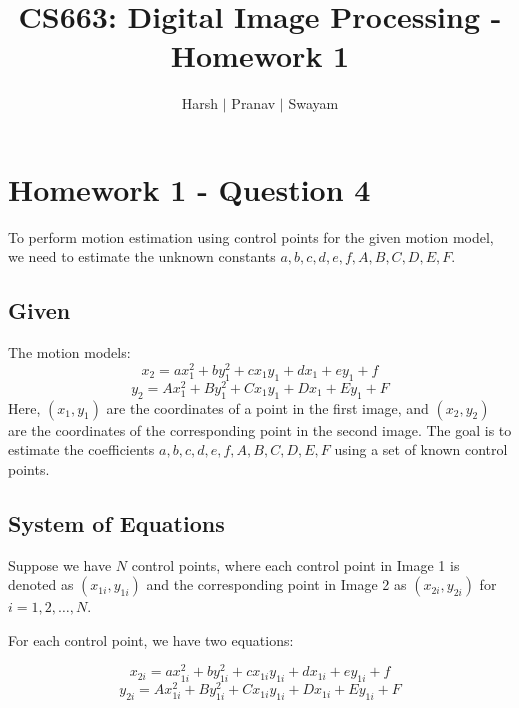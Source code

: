 \documentclass{article}
\title{CS663: Digital Image Processing - Homework 1}
\author{Harsh $\vert$ Pranav $\vert$ Swayam}
\begin{document}
\maketitle
\section{Homework 1 - Question 4}

To perform motion estimation using control points for the given motion model, we need to estimate the unknown constants \(a, b, c, d, e, f, A, B, C, D, E, F\).

\subsection*{Given}
The motion models:
\[
x_2 = ax_1^2 + by_1^2 + cx_1y_1 + dx_1 + ey_1 + f
\]
\[
y_2 = Ax_1^2 + By_1^2 + Cx_1y_1 + Dx_1 + Ey_1 + F
\]
Here, \( (x_1, y_1) \) are the coordinates of a point in the first image, and \( (x_2, y_2) \) are the coordinates of the corresponding point in the second image. The goal is to estimate the coefficients \( a, b, c, d, e, f, A, B, C, D, E, F \) using a set of known control points.

\subsection*{System of Equations}
Suppose we have \(N\) control points, where each control point in Image 1 is denoted as \( (x_{1i}, y_{1i}) \) and the corresponding point in Image 2 as \( (x_{2i}, y_{2i}) \) for \( i = 1, 2, \ldots, N \).

For each control point, we have two equations:

\[
x_{2i} = a x_{1i}^2 + b y_{1i}^2 + c x_{1i}y_{1i} + d x_{1i} + e y_{1i} + f
\]
\[
y_{2i} = A x_{1i}^2 + B y_{1i}^2 + C x_{1i}y_{1i} + D x_{1i} + E y_{1i} + F
\]
\end{document}
